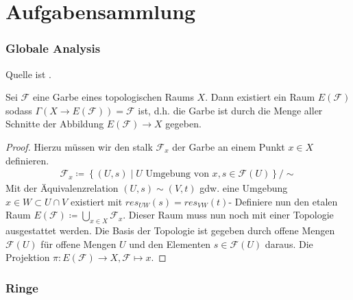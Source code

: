 \documentclass[ngerman, parskip=half, titlepage=false]{scrartcl}
\begin{document}
\part{Aufgabensammlung}

\section{Globale Analysis}
Quelle ist \cite[Seite 4]{ramananglobal}.
\begin{Satz}
	Sei $ \mathcal{F} $ eine Garbe eines topologischen
	Raums $ X $. Dann existiert ein Raum $ E(\mathcal{F}) $
	sodass $ \Gamma(X \to E(\mathcal{F})) = \mathcal{F} $ ist, d.h.
	die Garbe ist durch die Menge aller Schnitte der Abbildung
	$ E(\mathcal{F}) \to X $ gegeben.
	\begin{proof}
		Hierzu müssen wir den stalk $ \mathcal{F}_x $ der Garbe
		an einem Punkt $ x\in X $ definieren.
		\begin{gather*}
			\mathcal{F}_x \coloneqq \left\{ (U,s) \middle| U \text{ Umgebung von }x , s\in \mathcal{F}(U)  \right\} / \sim
		\end{gather*}
		Mit der Äquivalenzrelation $ (U,s)\sim (V,t) $ gdw.
		eine Umgebung $x\in W \subset U\cap V $ existiert mit
		$ res_{UW}(s)=res_{VW}(t) $-
		Definiere nun den etalen Raum $ E(\mathcal{F}) \coloneqq \bigcup_{x\in X} \mathcal{F}_x$. Dieser Raum muss nun noch mit einer
		Topologie ausgestattet werden. Die Basis der Topologie
		ist gegeben durch offene Mengen $ \mathcal{F}(U)$ 
		für offene Mengen $ U $ und den Elementen $ s\in \mathcal{F}(U) $ daraus. Die Projektion $ \pi \colon E(\mathcal{F}) \to X , \mathcal{F} \mapsto x $.
	\end{proof}
\end{Satz}

\section{Ringe}
\end{document}
